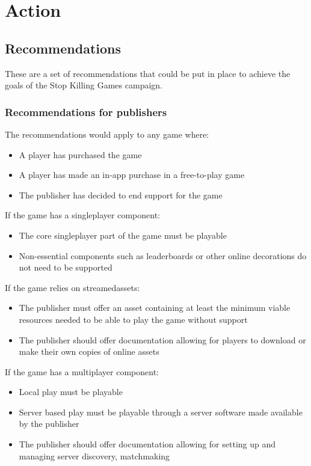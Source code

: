 \chapter{Action}

\section{Recommendations}
These are a set of recommendations that could be put in place to achieve the goals of the Stop Killing Games campaign.


\subsection{Recommendations for publishers}

The recommendations would apply to any game where:
\begin{itemize}
    \item A player has purchased the game
    \item A player has made an in-app purchase in a free-to-play game
    \item The publisher has decided to end support for the game
\end{itemize}

If the game has a singleplayer component:
\begin{itemize}
    \item The core singleplayer part of the game must be playable
    \item Non-essential components such as leaderboards or other online decorations do not need to be supported
\end{itemize}

If the game relies on \gls{streamedassets}:
\begin{itemize}
    \item The publisher must offer an \gls{asset} containing at least the minimum viable resources needed to be able to play the game without support
    \item The publisher should offer documentation allowing for players to download or make their own copies of online \glspl{asset}
\end{itemize}

If the game has a multiplayer component:
\begin{itemize}
    \item Local play must be playable
    \item Server based play must be playable through a server software made available by the publisher
    \item The publisher should offer documentation allowing for setting up and managing server discovery, \gls{matchmaking}
\end{itemize}

